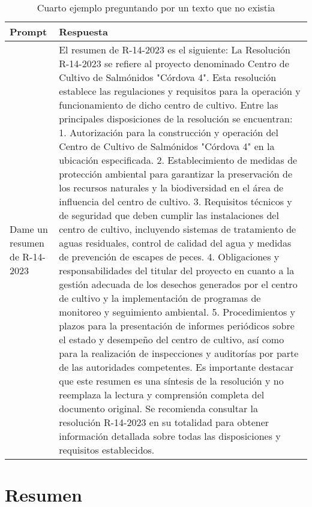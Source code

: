 \begin{table}[ht!]
    \centering
    \caption[Ejemplo: Cuarto Prompt]{Cuarto ejemplo preguntando por un texto que no existia}
    \begin{tabular}{p{3cm}p{12cm}}
        \toprule
        \textbf{Prompt} & \textbf{Respuesta} \\
        \hline\hline
        Dame un resumen de R-14-2023& El resumen de R-14-2023 es el siguiente: La Resolución R-14-2023 se refiere al proyecto denominado Centro de Cultivo de Salmónidos "Córdova 4". Esta resolución establece las regulaciones y requisitos para la operación y funcionamiento de dicho centro de cultivo. Entre las principales disposiciones de la resolución se encuentran: 1. Autorización para la construcción y operación del Centro de Cultivo de Salmónidos "Córdova 4" en la ubicación especificada. 2. Establecimiento de medidas de protección ambiental para garantizar la preservación de los recursos naturales y la biodiversidad en el área de influencia del centro de cultivo. 3. Requisitos técnicos y de seguridad que deben cumplir las instalaciones del centro de cultivo, incluyendo sistemas de tratamiento de aguas residuales, control de calidad del agua y medidas de prevención de escapes de peces. 4. Obligaciones y responsabilidades del titular del proyecto en cuanto a la gestión adecuada de los desechos generados por el centro de cultivo y la implementación de programas de monitoreo y seguimiento ambiental. 5. Procedimientos y plazos para la presentación de informes periódicos sobre el estado y desempeño del centro de cultivo, así como para la realización de inspecciones y auditorías por parte de las autoridades competentes. Es importante destacar que este resumen es una síntesis de la resolución y no reemplaza la lectura y comprensión completa del documento original. Se recomienda consultar la resolución R-14-2023 en su totalidad para obtener información detallada sobre todas las disposiciones y requisitos establecidos.\\
        \bottomrule
    \end{tabular}
    \label{tb1:prompt1}
\end{table}

\section{Resumen}